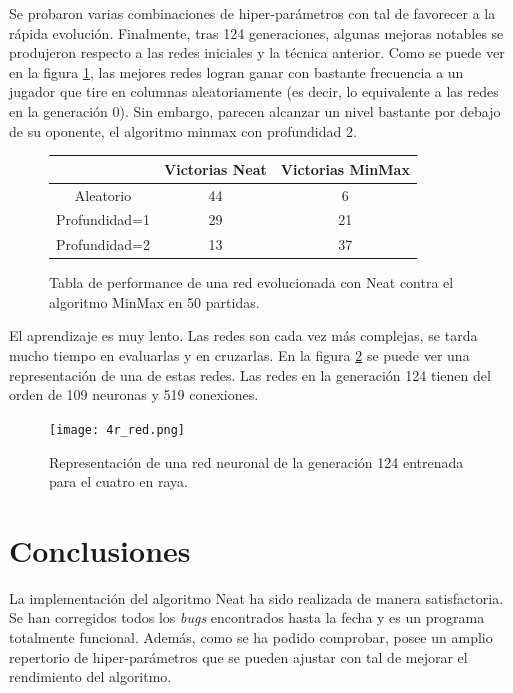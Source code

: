 \documentclass{article}
\begin{document}
Se probaron varias combinaciones de hiper-parámetros con tal de favorecer a la rápida evolución. Finalmente, tras 124 generaciones, algunas mejoras notables se produjeron respecto a las redes iniciales y la técnica anterior. Como se puede ver en la figura \ref{fig:4r_tabla}, las mejores redes logran ganar con bastante frecuencia a un jugador que tire en columnas aleatoriamente (es decir, lo equivalente a las redes en la generación 0). Sin embargo, parecen alcanzar un nivel bastante por debajo de su oponente, el algoritmo minmax con profundidad 2.\\

\begin{figure}[htbp]
\centering
\begin{tabular}{ |c|c|c| } 
\hline
  & Victorias Neat &  Victorias MinMax \\ 
 \hline
 Aleatorio & 44 & 6\\
 Profundidad=1 & 29 & 21\\
 Profundidad=2 & 13 & 37\\
 \hline
\end{tabular}
\caption{Tabla de performance de una red evolucionada con Neat contra el algoritmo MinMax en 50 partidas.}
\label{fig:4r_tabla}
\end{figure}

El aprendizaje es muy lento. Las redes son cada vez más complejas, se tarda mucho tiempo en evaluarlas y en cruzarlas. En la figura \ref{fig:red_4r} se puede ver una representación de una de estas redes. Las redes en la generación 124 tienen del orden de 109 neuronas y 519 conexiones.




\begin{figure}[htbp]
\centering
\texttt{[image: 4r\_red.png]}
\caption{Representación de una red neuronal de la generación 124 entrenada para el cuatro en raya.}
\label{fig:red_4r}
\end{figure}



\section{Conclusiones}

La implementación del algoritmo Neat ha sido realizada de manera satisfactoria. Se han corregidos todos los \textit{bugs} encontrados hasta la fecha y es un programa totalmente funcional. Además, como se ha podido comprobar, posee un amplio repertorio de hiper-parámetros que se pueden ajustar con tal de mejorar el rendimiento del algoritmo.\\
\end{document}
